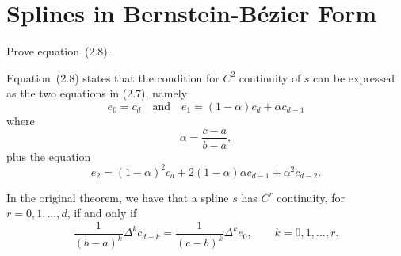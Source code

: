 \section{Splines in Bernstein-Bézier Form}

\begin{exercise}
    Prove equation~(2.8).
\end{exercise}

\begin{solution}
    Equation~(2.8) states that the condition for $C^2$ continuity of $s$ can be expressed as the two equations in (2.7), namely
    \begin{equation*}
        e_0 = c_d \quad \text{and} \quad e_1 = (1 - \alpha) c_d + \alpha c_{d-1}
    \end{equation*}
    where
    \begin{equation*}
        \alpha = \frac{c - a}{b - a},
    \end{equation*}
    plus the equation
    \begin{equation*}
        e_2 = (1 - \alpha)^2 c_d + 2(1 - \alpha) \alpha c_{d-1} + \alpha^2 c_{d-2}.
    \end{equation*}

    In the original theorem, we have that a spline $s$ has $C^r$ continuity, for $r = 0, 1, \ldots, d$, if and only if
    \begin{equation*}
        \frac{1}{(b - a)^k} \Delta^k c_{d - k} = \frac{1}{(c - b)^k} \Delta^k e_0, \qquad k = 0, 1, \ldots, r.
    \end{equation*}


\end{solution}
